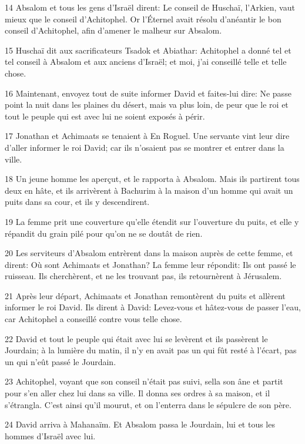 \par 14 Absalom et tous les gens d'Israël dirent: Le conseil de Huschaï, l'Arkien, vaut mieux que le conseil d'Achitophel. Or l'Éternel avait résolu d'anéantir le bon conseil d'Achitophel, afin d'amener le malheur sur Absalom.
\par 15 Huschaï dit aux sacrificateurs Tsadok et Abiathar: Achitophel a donné tel et tel conseil à Absalom et aux anciens d'Israël; et moi, j'ai conseillé telle et telle chose.
\par 16 Maintenant, envoyez tout de suite informer David et faites-lui dire: Ne passe point la nuit dans les plaines du désert, mais va plus loin, de peur que le roi et tout le peuple qui est avec lui ne soient exposés à périr.
\par 17 Jonathan et Achimaats se tenaient à En Roguel. Une servante vint leur dire d'aller informer le roi David; car ils n'osaient pas se montrer et entrer dans la ville.
\par 18 Un jeune homme les aperçut, et le rapporta à Absalom. Mais ils partirent tous deux en hâte, et ils arrivèrent à Bachurim à la maison d'un homme qui avait un puits dans sa cour, et ils y descendirent.
\par 19 La femme prit une couverture qu'elle étendit sur l'ouverture du puits, et elle y répandit du grain pilé pour qu'on ne se doutât de rien.
\par 20 Les serviteurs d'Absalom entrèrent dans la maison auprès de cette femme, et dirent: Où sont Achimaats et Jonathan? La femme leur répondit: Ils ont passé le ruisseau. Ils cherchèrent, et ne les trouvant pas, ils retournèrent à Jérusalem.
\par 21 Après leur départ, Achimaats et Jonathan remontèrent du puits et allèrent informer le roi David. Ils dirent à David: Levez-vous et hâtez-vous de passer l'eau, car Achitophel a conseillé contre vous telle chose.
\par 22 David et tout le peuple qui était avec lui se levèrent et ils passèrent le Jourdain; à la lumière du matin, il n'y en avait pas un qui fût resté à l'écart, pas un qui n'eût passé le Jourdain.
\par 23 Achitophel, voyant que son conseil n'était pas suivi, sella son âne et partit pour s'en aller chez lui dans sa ville. Il donna ses ordres à sa maison, et il s'étrangla. C'est ainsi qu'il mourut, et on l'enterra dans le sépulcre de son père.
\par 24 David arriva à Mahanaïm. Et Absalom passa le Jourdain, lui et tous les hommes d'Israël avec lui.

